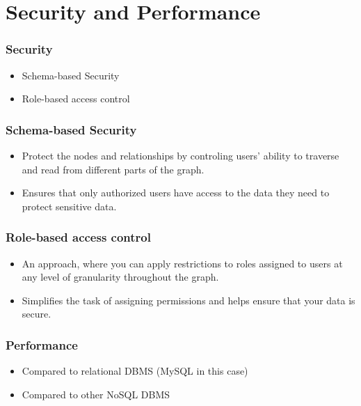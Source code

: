 \documentclass[aspectratio=169]{beamer}
\begin{document}
\section{Security and Performance}

\begin{frame}
    \frametitle{Security}

    \begin{itemize}
        \item Schema-based Security 
        \item Role-based access control 
    \end{itemize}
\end{frame}

\begin{frame}
    \frametitle{Schema-based Security}
    \begin{itemize}
        \item Protect the nodes and relationships by controling users' ability to traverse and read from different parts of the graph.
        \item Ensures that only authorized users have access to the data they need to protect sensitive data.
    \end{itemize}
\end{frame}

\begin{frame}
    \frametitle{Role-based access control}
    \begin{itemize}
        \item An approach, where you can apply restrictions to roles assigned to users at any level of granularity throughout the graph.
        \item Simplifies the task of assigning permissions and helps ensure that your data is secure.
    \end{itemize}
\end{frame}

\begin{frame}
    \frametitle{Performance}

    \begin{itemize}
        \item Compared to relational DBMS (MySQL in this case)
        \item Compared to other NoSQL DBMS
    \end{itemize}
\end{frame}
\end{document}

